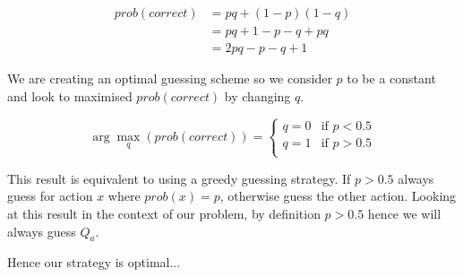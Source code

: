 \begin{align*}
    prob(correct) &= pq + (1-p)(1-q)\\
    &= pq + 1-p-q+pq\\
    &= 2pq-p-q+1
\end{align*}

We are creating an optimal guessing scheme so we consider $p$ to be a constant and look to maximised $prob(correct)$ by changing $q$.

\[
    \arg \max_q(prob(correct)) = \begin{cases}
        q = 0 & \text{if } p<0.5\\
        q = 1 & \text{if } p>0.5\\
    \end{cases}
\]

This result is equivalent to using a greedy guessing strategy.
If $p>0.5$ always guess for action $x$ where $prob(x)=p$, otherwise guess the other action.
Looking at this result in the context of our problem, by definition $p>0.5$ hence we will always guess $Q_a$.

Hence our strategy is optimal...